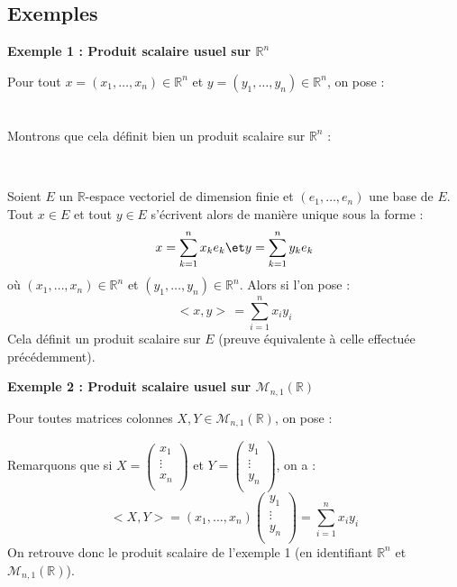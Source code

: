 \documentclass[a4paper,10pt]{report}
\begin{document}
\subsection{Exemples}

\noindent \textbf{Exemple 1 : Produit scalaire usuel sur $\mathbb{R}^n$}

\noindent Pour tout $x=(x_1, \ldots, x_n) \in \mathbb{R}^n$ et $y=(y_1, \ldots, y_n) \in \mathbb{R}^n$, on pose :
$$ \phantom{\boxed{<x,y> \, = \sum_{i=1}^n x_i y_i }}$$
Montrons que cela définit bien un produit scalaire sur $\mathbb{R}^n$ :

\vspace{6cm}

\newpage

$\phantom{test}$

\vspace{2cm}

\begin{rem} Soient $E$ un $\mathbb{R}$-espace vectoriel de dimension finie et $(e_1, \ldots, e_n)$ une base de $E$. Tout $x \in E$ et tout $y \in E$ s'écrivent alors de manière unique sous la forme :
$$ x = \sum_{k=1}^n x_k e_k \et  y = \sum_{k=1}^n y_k e_k$$
où $(x_1, \ldots, x_n) \in \mathbb{R}^n$ et $(y_1, \ldots, y_n) \in \mathbb{R}^n$. Alors si l'on pose :
$$ <x,y> \, = \sum_{i=1}^n x_i y_i$$
Cela définit un produit scalaire sur $E$ (preuve équivalente à celle effectuée précédemment).
\end{rem} 
\medskip

\noindent \textbf{Exemple 2 : Produit scalaire usuel sur $\mathcal{M}_{n,1}(\mathbb{R})$}

\noindent Pour toutes matrices colonnes $X, Y \in \mathcal{M}_{n,1}(\mathbb{R})$, on pose :
$$ \phantom{\boxed{<X,Y> \, = ~^tX Y }}$$
Remarquons que si $X = \begin{pmatrix}
x_1 \\
\vdots \\
x_n \\
\end{pmatrix}$ et $Y = \begin{pmatrix}
y_1 \\
\vdots \\
y_n \\
\end{pmatrix}$, on a :
$$ <X,Y> = (x_1, \ldots, x_n) \begin{pmatrix}
y_1 \\
\vdots \\
y_n \\
\end{pmatrix} = \sum_{i=1}^{n} x_i y_i $$
On retrouve donc le produit scalaire de l'exemple 1 (en identifiant $\mathbb{R}^n$ et $\mathcal{M}_{n,1}(\mathbb{R})$).
\end{document}
